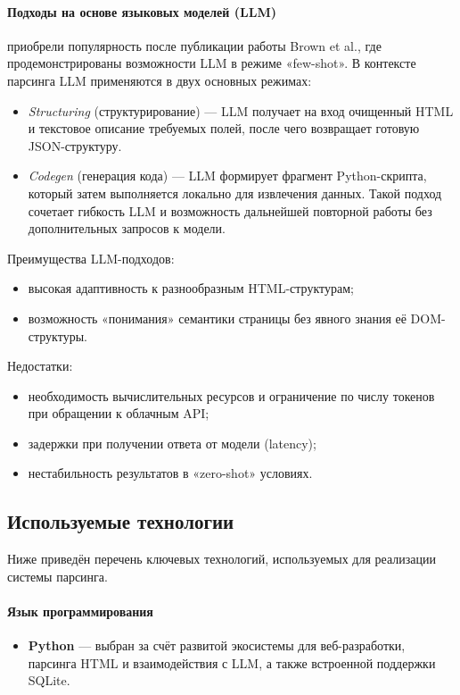 \paragraph{Подходы на основе языковых моделей (LLM)} приобрели популярность после публикации работы Brown et al.\cite{Brown2020}, где продемонстрированы возможности LLM в режиме «few-shot». В контексте парсинга LLM применяются в двух основных режимах:
\begin{itemize}
    \item \emph{Structuring} (структурирование) — LLM получает на вход очищенный HTML и текстовое описание требуемых полей, после чего возвращает готовую JSON-структуру\cite{Kalyan2023,Li2024}.
    \item \emph{Codegen} (генерация кода) — LLM формирует фрагмент Python-скрипта, который затем выполняется локально для извлечения данных. Такой подход сочетает гибкость LLM и возможность дальнейшей повторной работы без дополнительных запросов к модели\cite{Dong2022CacheLLM}.
\end{itemize}
Преимущества LLM-подходов:
\begin{itemize}
    \item высокая адаптивность к разнообразным HTML-структурам;
    \item возможность «понимания» семантики страницы без явного знания её DOM-структуры\cite{Kolluru2023HybridParsing}.
\end{itemize}
Недостатки:
\begin{itemize}
    \item необходимость вычислительных ресурсов и ограничение по числу токенов при обращении к облачным API\cite{OpenAI2023Costs};
    \item задержки при получении ответа от модели (latency);
    \item нестабильность результатов в «zero-shot» условиях.
\end{itemize}

\subsection{Используемые технологии}

Ниже приведён перечень ключевых технологий, используемых для реализации системы парсинга.

\paragraph{Язык программирования}
\begin{itemize}
    \item \textbf{Python}\cite{PythonDocumentation} — выбран за счёт развитой экосистемы для веб-разработки, парсинга HTML и взаимодействия с LLM, а также встроенной поддержки SQLite.
\end{itemize}

